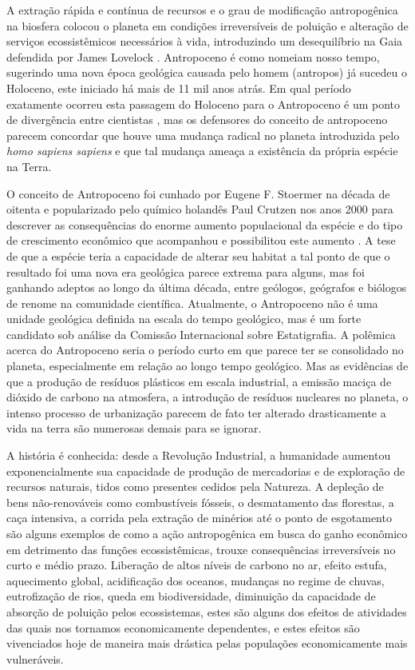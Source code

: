 \documentclass[
article,			%
11pt,				%
oneside,			%
a4paper,			%
english,			%
brazil,				%
sumario=tradicional
]{abntex2}
\begin{document}
	A extração rápida e contínua de recursos e o grau de modificação antropogênica na biosfera colocou o planeta em condições irreversíveis de poluição e alteração de serviços ecossistêmicos necessários à vida, introduzindo um desequilíbrio na Gaia defendida por James Lovelock . Antropoceno é como nomeiam nosso tempo, sugerindo uma nova época geológica causada pelo homem (antropos) já sucedeu o Holoceno, este iniciado há mais de 11 mil anos atrás. Em qual período exatamente ocorreu esta passagem do Holoceno para o Antropoceno é um ponto de divergência entre cientistas \cite[p.3]{hamilton2016a}, mas os defensores do conceito de antropoceno parecem concordar que houve uma mudança radical no planeta introduzida pelo \textit{homo sapiens sapiens} e que tal mudança ameaça a existência da própria espécie na Terra.
	
	O conceito de Antropoceno foi cunhado por Eugene F. Stoermer na década de oitenta e popularizado pelo químico holandês Paul Crutzen nos anos 2000 para descrever as consequências do enorme aumento populacional da espécie e do tipo de crescimento econômico que acompanhou e possibilitou este aumento \cite{crutzen2006a}. A tese de que a espécie teria a capacidade de alterar seu habitat a tal ponto de que o resultado foi uma nova era geológica parece extrema para alguns, mas foi ganhando adeptos ao longo da última década, entre geólogos, geógrafos e biólogos de renome na comunidade científica.  Atualmente, o Antropoceno não é uma unidade geológica definida na escala do tempo geológico, mas é um forte candidato sob análise da Comissão Internacional sobre Estatigrafia.  A polêmica acerca do Antropoceno seria o período curto em que parece ter se consolidado no planeta, especialmente em relação ao longo tempo geológico. Mas as evidências de que a produção de resíduos plásticos em escala industrial, a emissão maciça de dióxido de carbono na atmosfera, a introdução de resíduos nucleares no planeta, o intenso processo de urbanização parecem de fato ter alterado drasticamente a vida na terra são numerosas demais para se ignorar. 
	
	A história é conhecida: desde a Revolução Industrial, a humanidade aumentou exponencialmente sua capacidade de produção de mercadorias e de exploração de recursos naturais, tidos como presentes cedidos pela Natureza. A depleção de bens não-renováveis como combustíveis fósseis, o desmatamento das florestas, a caça intensiva, a corrida pela extração de minérios até o ponto de esgotamento são alguns exemplos de como a ação antropogênica em busca do ganho econômico em detrimento das funções ecossistêmicas, trouxe consequências irreversíveis no curto e médio prazo. Liberação de altos níveis de carbono no ar, efeito estufa, aquecimento global, acidificação dos oceanos, mudanças no regime de chuvas, eutrofização de rios, queda em biodiversidade, diminuição da capacidade de absorção de poluição pelos ecossistemas, estes são alguns dos efeitos de atividades das quais nos tornamos economicamente dependentes, e estes efeitos são vivenciados hoje de maneira mais drástica pelas populações economicamente mais vulneráveis.
	
\end{document}
